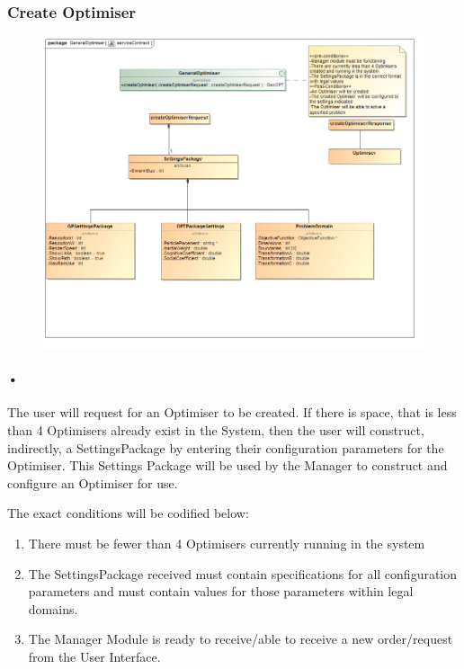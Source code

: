 \documentclass[11pt]{article}
\begin{document}
\subsubsection{Create Optimiser}
\begin{figure}[h]
\includegraphics[scale=0.4]{serviceContractOPT.png}
\end{figure}

\paragraph{•}
The user will request for an Optimiser to be created. If there is space, that is less than 4 Optimisers already exist in the System, then the user will construct, indirectly, a SettingsPackage by entering their configuration parameters for the Optimiser. This Settings Package will be used by the Manager to construct and configure an Optimiser for use.

The exact conditions will be codified below:
\begin{enumerate}
\item There must be fewer than 4 Optimisers currently running in the system
\item The SettingsPackage received must contain specifications for all configuration parameters and must contain values for those parameters within legal domains.
\item The Manager Module is ready to receive/able to receive a new order/request from the User Interface.
\end{enumerate}
\end{document}
